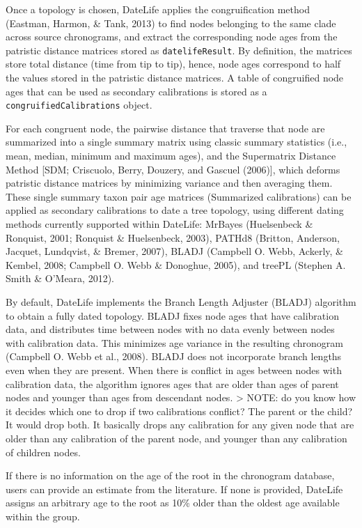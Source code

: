 \documentclass[
  english,
  man]{apa6}
\begin{document}
Once a topology is chosen, DateLife applies the congruification method (Eastman, Harmon, \& Tank, 2013) to find nodes belonging to the same clade across source chronograms, and extract the corresponding node ages from the patristic distance matrices stored as \texttt{datelifeResult}. By definition, the matrices store total distance (time from tip to tip), hence, node ages correspond to half the values stored in the patristic distance matrices.
A table of congruified node ages that can be used as secondary calibrations is stored as a \texttt{congruifiedCalibrations} object.

For each congruent node, the pairwise distance that traverse that node are summarized into a single summary matrix using classic summary statistics (i.e., mean, median, minimum and maximum ages), and the Supermatrix Distance Method {[}SDM; Criscuolo, Berry, Douzery, and Gascuel (2006){]}, which deforms patristic distance matrices by minimizing variance and then averaging them.
These single summary taxon pair age matrices (Summarized calibrations) can be applied as secondary calibrations to date a tree topology, using different dating methods currently supported within DateLife: MrBayes (Huelsenbeck \& Ronquist, 2001; Ronquist \& Huelsenbeck, 2003), PATHd8 (Britton, Anderson, Jacquet, Lundqvist, \& Bremer, 2007), BLADJ (Campbell O. Webb, Ackerly, \& Kembel, 2008; Campbell O. Webb \& Donoghue, 2005), and treePL (Stephen A. Smith \& O'Meara, 2012).

By default, DateLife implements the Branch Length Adjuster (BLADJ) algorithm to obtain a fully dated topology. BLADJ fixes node ages that have calibration data, and distributes time between nodes with no data evenly between nodes with calibration data.
This minimizes age variance in the resulting chronogram (Campbell O. Webb et al., 2008).
BLADJ does not incorporate branch lengths even when they are present.
When there is conflict in ages between nodes with calibration data, the algorithm ignores ages that are older than ages of parent nodes and younger than ages from descendant nodes.
\textgreater{} NOTE: do you know how it decides which one to drop if two calibrations conflict? The parent or the child? It would drop both. It basically drops any calibration for any given node that are older than any calibration of the parent node, and younger than any calibration of children nodes.

If there is no information on the age of the root in the chronogram database, users can provide an estimate from the literature. If none is provided, DateLife assigns an arbitrary age to the root as 10\% older than the oldest age available within the group.
\end{document}
